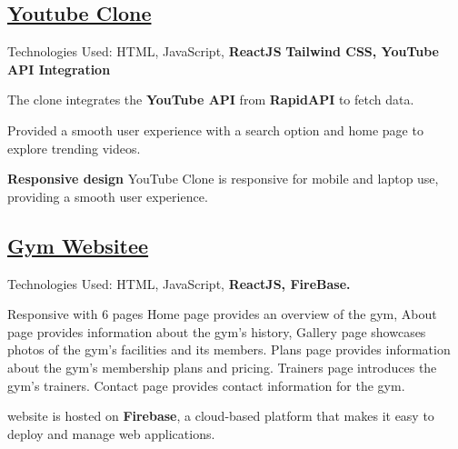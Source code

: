 \subsection{{\href{https://clone-c42e9.web.app/}{Youtube Clone} \hfill }}
\begin{zitemize}
\item Technologies Used: HTML, JavaScript,  
{\textbf{ReactJS}}
\textbf{Tailwind CSS, YouTube API Integration} 
  
\item  The clone integrates the \textbf{YouTube API} from \textbf{RapidAPI} to fetch data.
\item Provided a smooth user experience with a search option and home page to explore trending videos.
\item \textbf{Responsive design} YouTube Clone is responsive for mobile and laptop use, providing a smooth user experience.
\end{zitemize}



\subsection{{\href{https://react-modern-website.web.app/}{ Gym Websitee} \hfill }}
\begin{zitemize}
\item Technologies Used: HTML, JavaScript,  
{\textbf{ReactJS, FireBase.}}
\item Responsive with 6 pages Home page provides an overview of the gym,
About page provides information about the gym's history,
Gallery page  showcases photos of the gym's facilities and its members.
Plans page provides information about the gym's membership plans and pricing.
Trainers page introduces the gym's trainers.
Contact page  provides contact information for the gym.

\item website is hosted on \textbf{Firebase}, a cloud-based platform that makes it easy to deploy and manage web applications.
\end{zitemize}